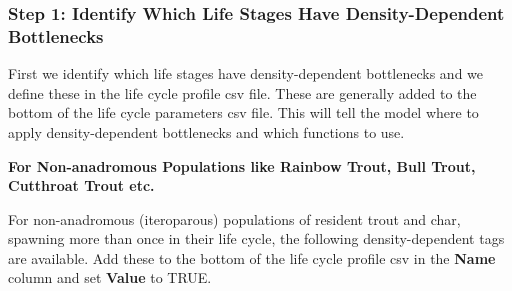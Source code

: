 \documentclass[
  letterpaper,
  DIV=11,
  numbers=noendperiod]{scrreprt}
\begin{document}
\subsubsection{Step 1: Identify Which Life Stages Have Density-Dependent
Bottlenecks}\label{step-1-identify-which-life-stages-have-density-dependent-bottlenecks}

First we identify which life stages have density-dependent bottlenecks
and we define these in the life cycle profile csv file. These are
generally added to the bottom of the life cycle parameters csv file.
This will tell the model where to apply density-dependent bottlenecks
and which functions to use.

\textbf{For Non-anadromous Populations like Rainbow Trout, Bull Trout,
Cutthroat Trout etc.}

For non-anadromous (iteroparous) populations of resident trout and char,
spawning more than once in their life cycle, the following
density-dependent tags are available. Add these to the bottom of the
life cycle profile csv in the \textbf{Name} column and set
\textbf{Value} to TRUE.
\end{document}
